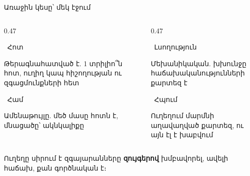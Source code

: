 \begin{frame}{Առաջին կեսը՝ մեկ էջում}
  \begin{columns}[T]
    \begin{column}{0.47\textwidth}
      \begin{card}\ {\blackfont Հոտ}\par Թերագնահատված է. 1 տրիլիո՞ն հոտ, ուղիղ կապ հիշողության ու զգացմունքների հետ\end{card}
      \begin{card}\ {\blackfont Համ}\par Ամենաթույլը. մեծ մասը հոտն է, մնացածը՝ ակնկալիքը\end{card}
    \end{column}
    \begin{column}{0.47\textwidth}
      \begin{card}\ {\blackfont Լսողություն}\par Մեխանիկական. խխունջը հաճախականությունների քարտեզ է\end{card}
      \begin{card}\ {\blackfont Հպում}\par Ուղեղում մարմնի աղավաղված քարտեզ, ու այն էլ է խաբվում\end{card}
    \end{column}
  \end{columns}
  \vspace{1mm}
  \centering\small Ուղեղը սիրում է զգայարանները \textbf{զույգերով} խմբավորել, ավելի հաճախ, քան գործնական է։
\end{frame}

\begin{frame}[plain]
\end{frame}
